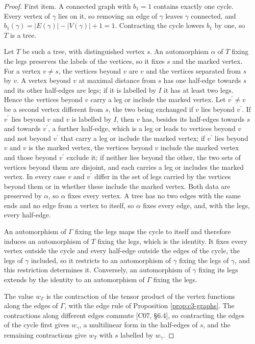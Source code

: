 \begin{proof}
First item. A connected graph with $b_1=1$ contains exactly one cycle. Every vertex of $\gamma$ lies on it, so removing an edge of $\gamma$ leaves $\gamma$ connected, and $b_1(\gamma)=|E(\gamma)|-|V(\gamma)|+1=1$. Contracting the cycle lowers $b_1$ by one, so $T$ is a tree.

Let $T$ be such a tree, with distinguished vertex $s$. An automorphism $\alpha$ of $T$ fixing the legs preserves the labels of the vertices, so it fixes $s$ and the marked vertex. For a vertex $v\neq s$, the vertices beyond $v$ are $v$ and the vertices separated from $s$ by $v$. A vertex beyond $v$ at maximal distance from $s$ has one half-edge towards $s$ and its other half-edges are legs; if it is labelled by $I$ it has at least two legs. Hence the vertices beyond $v$ carry a leg or include the marked vertex. Let $v^{\prime}\neq v$ be a second vertex different from $s$, the two being exchanged if $v$ lies beyond $v^{\prime}$. If $v^{\prime}$ lies beyond $v$ and $v$ is labelled by $I$, then $v$ has, besides its half-edges towards $s$ and towards $v^{\prime}$, a further half-edge, which is a leg or leads to vertices beyond $v$ and not beyond $v^{\prime}$ that carry a leg or include the marked vertex; if $v^{\prime}$ lies beyond $v$ and $v$ is the marked vertex, the vertices beyond $v$ include the marked vertex and those beyond $v^{\prime}$ exclude it; if neither lies beyond the other, the two sets of vertices beyond them are disjoint, and each carries a leg or includes the marked vertex. In every case $v$ and $v^{\prime}$ differ in the set of legs carried by the vertices beyond them or in whether these include the marked vertex. Both data are preserved by $\alpha$, so $\alpha$ fixes every vertex. A tree has no two edges with the same ends and no edge from a vertex to itself, so $\alpha$ fixes every edge, and, with the legs, every half-edge.

An automorphism of $\Gamma$ fixing the legs maps the cycle to itself and therefore induces an automorphism of $T$ fixing the legs, which is the identity. It fixes every vertex outside the cycle and every half-edge outside the edges of the cycle, the legs of $\gamma$ included, so it restricts to an automorphism of $\gamma$ fixing the legs of $\gamma$, and this restriction determines it. Conversely, an automorphism of $\gamma$ fixing its legs extends by the identity to an automorphism of $\Gamma$ fixing the legs.

The value $w_\Gamma$ is the contraction of the tensor product of the vertex functions along the edges of $\Gamma$, with the edge rule of Proposition \ref{prop:c3-graphs}. The contractions along different edges commute [C07, §6.4], so contracting the edges of the cycle first gives $w_\gamma$, a multilinear form in the half-edges of $s$, and the remaining contractions give $w_T$ with $s$ labelled by $w_\gamma$.


\end{proof}
